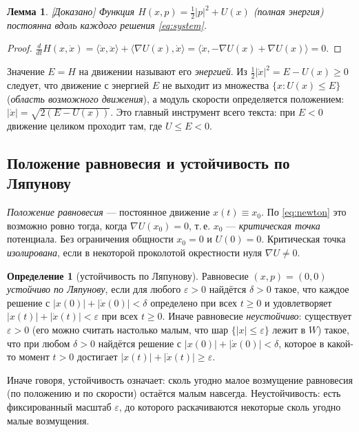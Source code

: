 \documentclass[11pt,a4paper]{article}
\newtheorem{lemma}[theorem]{Лемма}
\theoremstyle{definition}
\newtheorem{definition}[theorem]{Определение}
\newcommand{\eps}{\varepsilon}
\newcommand{\mk}[1]{\textsf{[#1]}}
\newcommand{\term}[1]{\emph{#1}}
\begin{document}
\begin{lemma}\label{lem:energy}
\mk{Доказано} Функция $H(x,p)=\tfrac12|p|^2+U(x)$ (\term{полная энергия}) постоянна вдоль
каждого решения \eqref{eq:system}.
\end{lemma}
\begin{proof}
$\frac{d}{dt}H(x,\dot x)=\langle\dot x,\ddot x\rangle+\langle\nabla U(x),\dot x\rangle
=\langle\dot x,-\nabla U(x)+\nabla U(x)\rangle=0$.
\end{proof}

Значение $E=H$ на движении называют его \term{энергией}. Из $\tfrac12|\dot x|^2=E-U(x)\ge0$
следует, что движение с энергией $E$ не выходит из множества $\{x:U(x)\le E\}$ (\term{область
возможного движения}), а модуль скорости определяется положением: $|\dot x|=\sqrt{2(E-U(x))}$.
Это главный инструмент всего текста: при $E<0$ движение целиком проходит там, где $U\le E<0$.

\subsection{Положение равновесия и устойчивость по Ляпунову}

\term{Положение равновесия} --- постоянное движение $x(t)\equiv x_0$. По \eqref{eq:newton} это
возможно ровно тогда, когда $\nabla U(x_0)=0$, т.\,е. $x_0$ --- \term{критическая точка}
потенциала. Без ограничения общности $x_0=0$ и $U(0)=0$. Критическая точка \term{изолирована},
если в некоторой проколотой окрестности нуля $\nabla U\ne0$.

\begin{definition}[устойчивость по Ляпунову]\label{def:stab}
Равновесие $(x,p)=(0,0)$ \term{устойчиво по Ляпунову}, если для любого $\eps>0$ найдётся
$\delta>0$ такое, что каждое решение с $|x(0)|+|\dot x(0)|<\delta$ определено при всех $t\ge0$
и удовлетворяет $|x(t)|+|\dot x(t)|<\eps$ при всех $t\ge0$. Иначе равновесие
\term{неустойчиво}: существует $\eps>0$ (его можно считать настолько малым, что шар
$\{|x|\le\eps\}$ лежит в $W$) такое, что при любом $\delta>0$ найдётся решение с
$|x(0)|+|\dot x(0)|<\delta$, которое в какой-то момент $t>0$ достигает $|x(t)|+|\dot x(t)|\ge\eps$.
\end{definition}

Иначе говоря, устойчивость означает: сколь угодно малое возмущение равновесия (по положению и
по скорости) остаётся малым навсегда. Неустойчивость: есть фиксированный масштаб $\eps$, до
которого раскачиваются некоторые сколь угодно малые возмущения.
\end{document}
